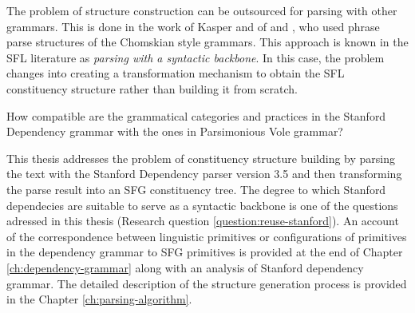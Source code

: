 
The problem of structure construction can be outsourced for parsing with other grammars. This is done in the work of Kasper \citet{Kasper1988} and of \citet{Honnibal2004a} and \citet{Honnibal2007}, who used phrase parse structures of the Chomskian style grammars. This approach is known in the SFL literature as \textit{parsing with a syntactic backbone}. In this case, the problem changes into creating a transformation mechanism to obtain the SFL constituency structure rather than building it from scratch. 


\begin{question}\label{question:reuse-stanford}
    How compatible are the grammatical categories and practices in the Stanford Dependency grammar with the ones in Parsimonious Vole grammar?
\end{question}

This thesis addresses the problem of constituency structure building by parsing the text with the Stanford Dependency parser version 3.5 \citep{Marneffe2008a,Marneffe2008, Marneffe2014} and then transforming the parse result into an SFG constituency tree. The degree to which Stanford dependecies are suitable to serve as a syntactic backbone is one of the questions adressed in this thesis (Research question \ref{question:reuse-stanford}). %
An account of the correspondence between linguistic primitives or configurations of primitives in the dependency grammar to SFG primitives is provided at the end of Chapter \ref{ch:dependency-grammar} along with an analysis of Stanford dependency grammar. The detailed description of the structure generation process is provided in the Chapter \ref{ch:parsing-algorithm}.

